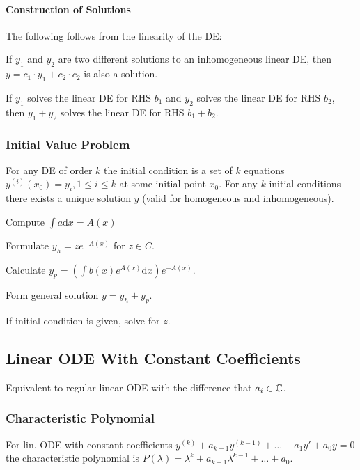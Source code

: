 \paragraph{Construction of Solutions}
The following follows from the linearity of the DE:
\begin{compactitem}
    \item If $y_1$ and $y_2$ are two different solutions to an inhomogeneous linear DE, then $y = c_1 \cdot y_1 + c_2 \cdot c_2$ is also a solution.
    \item If $y_1$ solves the linear DE for RHS $b_1$ and $y_2$ solves the linear DE for RHS $b_2$, then $y_1 + y_2$ solves the linear DE for RHS $b_1 + b_2$.
\end{compactitem}

\subsubsection{Initial Value Problem}
For any DE of order $k$ the initial condition is a set of $k$ equations $y^{(i)} (x_0) = y_i, 1 \le i \le k$ at some initial point $x_0$.  For any $k$ initial conditions there exists a unique solution $y$ (valid for homogeneous and inhomogeneous).

\begin{compactenum}
    \item Compute $\int a \mathrm{d}x = A(x)$
    \item Formulate $y_h = z e^{-A(x)}$ for $z \in C$.
    \item Calculate $y_p = (\int b(x) e^{A(x)} \mathrm{d}x) e^{-A(x)}$.
    \item Form general solution $y = y_h + y_p$.
    \item If initial condition is given, solve for $z$.
\end{compactenum}

\subsection{Linear ODE With Constant Coefficients}
Equivalent to regular linear ODE with the difference that $a_i \in \mathbb{C}$.

\subsubsection{Characteristic Polynomial}
For lin. ODE with constant coefficients $y^{(k)} + a_{k - 1}y^{(k - 1)} + \dots + a_1y' + a_0y = 0$ the characteristic polynomial is $P(\lambda) = \lambda^k + a_{k - 1} \lambda^{k - 1} + \dots + a_0$.

